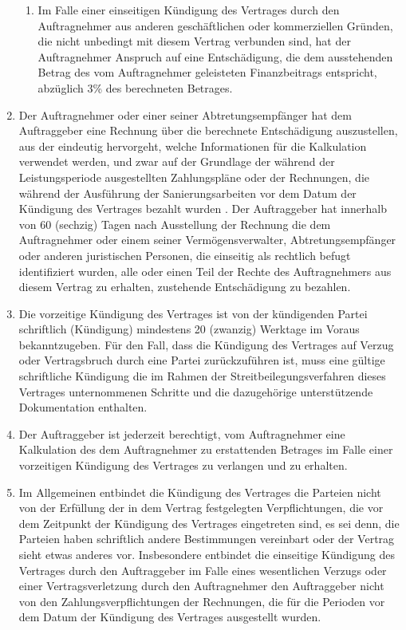 \begin{multicols}{2}
\begin{enumerate}
\begin{enumerate}
   \item Im Falle einer einseitigen Kündigung des Vertrages durch den Auftragnehmer aus anderen geschäftlichen oder kommerziellen Gründen, die nicht unbedingt mit diesem Vertrag verbunden sind, hat der Auftragnehmer Anspruch auf eine Entschädigung, die dem ausstehenden Betrag des vom Auftragnehmer geleisteten Finanzbeitrags entspricht, abzüglich 3\% des berechneten Betrages.
   \end{enumerate}
   \item Der Auftragnehmer oder einer seiner Abtretungsempfänger hat dem Auftraggeber eine Rechnung über die berechnete Entschädigung auszustellen, aus der eindeutig hervorgeht, welche Informationen für die Kalkulation verwendet werden, und zwar auf der Grundlage der während der Leistungsperiode ausgestellten Zahlungspläne oder der Rechnungen, die während der Ausführung der Sanierungsarbeiten vor dem Datum der Kündigung des Vertrages bezahlt wurden . Der Auftraggeber hat innerhalb von 60 (sechzig) Tagen nach Ausstellung der Rechnung die dem Auftragnehmer oder einem seiner Vermögensverwalter, Abtretungsempfänger oder anderen juristischen Personen, die einseitig als rechtlich befugt identifiziert wurden, alle oder einen Teil der Rechte des Auftragnehmers aus diesem Vertrag zu erhalten, zustehende Entschädigung zu bezahlen.
   \item Die vorzeitige Kündigung des Vertrages ist von der kündigenden Partei schriftlich (Kündigung) mindestens 20 (zwanzig) Werktage im Voraus bekanntzugeben. Für den Fall, dass die Kündigung des Vertrages auf Verzug oder Vertragsbruch durch eine Partei zurückzuführen ist, muss eine gültige schriftliche Kündigung die im Rahmen der Streitbeilegungsverfahren dieses Vertrages unternommenen Schritte und die dazugehörige unterstützende Dokumentation enthalten.
   \item Der Auftraggeber ist jederzeit berechtigt, vom Auftragnehmer eine Kalkulation des dem Auftragnehmer zu erstattenden Betrages im Falle einer vorzeitigen Kündigung des Vertrages zu verlangen und zu erhalten.
   \item Im Allgemeinen entbindet die Kündigung des Vertrages die Parteien nicht von der Erfüllung der in dem Vertrag festgelegten Verpflichtungen, die vor dem Zeitpunkt der Kündigung des Vertrages eingetreten sind, es sei denn, die Parteien haben schriftlich andere Bestimmungen vereinbart oder der Vertrag sieht etwas anderes vor. Insbesondere entbindet die einseitige Kündigung des Vertrages durch den Auftraggeber im Falle eines wesentlichen Verzugs oder einer Vertragsverletzung durch den Auftragnehmer den Auftraggeber nicht von den Zahlungsverpflichtungen der Rechnungen, die für die Perioden vor dem Datum der Kündigung des Vertrages ausgestellt wurden.

\end{enumerate}
\end{multicols}
